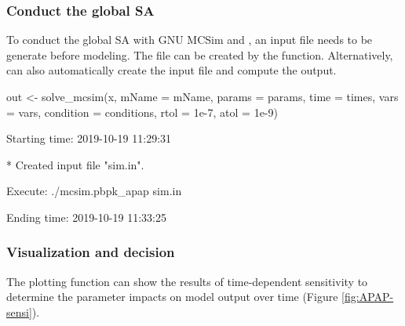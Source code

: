 \hypertarget{conduct-the-global-sa}{%
\subsubsection{Conduct the global SA}\label{conduct-the-global-sa}}

To conduct the global SA with GNU MCSim and , an input
file needs to be generate before modeling. The file can be created by
the  function. Alternatively, 
can also automatically create the input file and compute the output.

\begin{Schunk}
\begin{Sinput}
out <- solve_mcsim(x, mName = mName,
                   params = params, 
                   time = times, 
                   vars = vars,
                   condition = conditions, 
                   rtol = 1e-7, atol = 1e-9)
\end{Sinput}
\begin{Soutput}
  Starting time: 2019-10-19 11:29:31
\end{Soutput}
\begin{Soutput}
  * Created input file "sim.in".
\end{Soutput}
\begin{Soutput}
  Execute: ./mcsim.pbpk_apap sim.in
\end{Soutput}
\begin{Soutput}
  Ending time: 2019-10-19 11:33:25
\end{Soutput}
\end{Schunk}

\hypertarget{visualization-and-decision}{%
\subsubsection{Visualization and
decision}\label{visualization-and-decision}}

The plotting function can show the results of time-dependent sensitivity
to determine the parameter impacts on model output over time (Figure
\ref{fig:APAP-sensi}).

